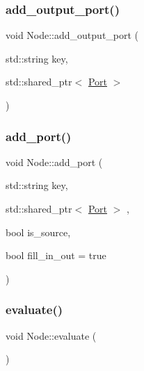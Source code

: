 \mbox{\label{class_node_a9df0ba6b43f1b59fd0bce26470b906ba}} 
\subsubsection{\texorpdfstring{add\+\_\+output\+\_\+port()}{add\_output\_port()}}
{\footnotesize\ttfamily void Node\+::add\+\_\+output\+\_\+port (\begin{DoxyParamCaption}\item[{std\+::string}]{key,  }\item[{std\+::shared\+\_\+ptr$<$ \hyperlink{class_port}{Port} $>$}]{ }\end{DoxyParamCaption})}

\mbox{\label{class_node_a139ab3c04753749cc35d2ff8c268c248}} 
\subsubsection{\texorpdfstring{add\+\_\+port()}{add\_port()}}
{\footnotesize\ttfamily void Node\+::add\+\_\+port (\begin{DoxyParamCaption}\item[{std\+::string}]{key,  }\item[{std\+::shared\+\_\+ptr$<$ \hyperlink{class_port}{Port} $>$}]{,  }\item[{bool}]{is\+\_\+source,  }\item[{bool}]{fill\+\_\+in\+\_\+out = {\ttfamily true} }\end{DoxyParamCaption})}

\mbox{\label{class_node_a0a3c8430a9e5b6b725c87bbcf7adc54b}} 
\subsubsection{\texorpdfstring{evaluate()}{evaluate()}}
{\footnotesize\ttfamily void Node\+::evaluate (\begin{DoxyParamCaption}{ }\end{DoxyParamCaption})}

\mbox{\label{class_node_a4ef31790680213bff2306ec34941941c}} 
